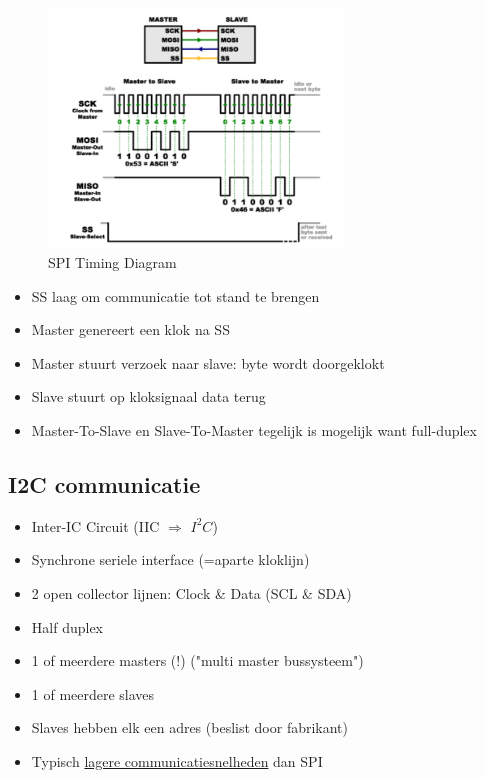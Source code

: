 \documentclass{article}
\begin{document}
\begin{figure}[H]
    \centering
    \includegraphics[width=0.7\textwidth]{Screenshot_20200330_114211.png}
    \caption{SPI Timing Diagram}
\end{figure}

\begin{itemize}
    \item SS laag om communicatie tot stand te brengen
    \item Master genereert een klok na SS
    \item Master stuurt verzoek naar slave: byte wordt doorgeklokt
    \item Slave stuurt op kloksignaal data terug
    \item Master-To-Slave en Slave-To-Master tegelijk is mogelijk want full-duplex
\end{itemize}

\subsection{I2C communicatie}
\begin{itemize}
    \item Inter-IC Circuit (IIC $\Rightarrow$ $I^2C$)
    \item Synchrone seriele interface (=aparte kloklijn)
    \item 2 open collector lijnen: Clock \& Data (SCL \& SDA)
    \item Half duplex
    \item 1 of meerdere masters (!) ("multi master bussysteem")
    \item 1 of meerdere slaves
    \item Slaves hebben elk een adres (beslist door fabrikant)
    \item Typisch \underline{lagere communicatiesnelheden} dan SPI
\end{itemize}
\end{document}
